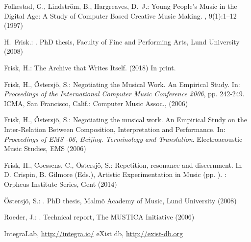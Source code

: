 \documentclass[,a4paper]{llncs}
\begin{document}
\begin{thebibliography}{10}
Folkestad, G., Lindstr\"{o}m, B., Hargreaves, D.~J.:
\newblock Young People's Music in the Digital Age: A Study of Computer Based
  Creative Music Making.
, 9(1):1--12 (1997)

H.~Frisk.:
.
\newblock PhD thesis, Faculty of Fine and Performing Arts, Lund University (2008)

Frisk, H.:
\newblock The Archive that Writes Itself.
 (2018)
\newblock In print.

Frisk, H., \"{O}stersj\"{o}, S.:
\newblock Negotiating the Musical Work. An Empirical Study.
\newblock In: {\em Proceedings of the International Computer Music Conference
  2006}, pp. 242-249. ICMA, San Francisco, Calif.: Computer Music Assoc.,
  (2006)

Frisk, H., \"{O}stersj\"{o}, S.:
\newblock Negotiating the musical work. {A}n Empirical Study on the
  Inter-Relation Between Composition, Interpretation and Performance.
\newblock In: {\em Proceedings of EMS -06, Beijing. Terminology and
  Translation}. Electroacoustic Music Studies, EMS (2006)

  Frisk, H., Coessens, C., \"Ostersj\"o, S.: Repetition,
  resonance and discernment. In D. Crispin, B. Gilmore (Eds.),
  Artistic Experimentation in Music (pp. ). : Orpheus Institute
  Series, Gent (2014)

\"{O}stersj\"{o}, S.:
.
\newblock PhD thesis, Malm\"{o} Academy of Music, Lund University (2008)

Roeder, J.:
.
\newblock Technical report, The MUSTICA Initiative (2006)

 IntegraLab, \url{http://integra.io/}
 eXist db, \url{http://exist-db.org}
\end{thebibliography}
\end{document}
